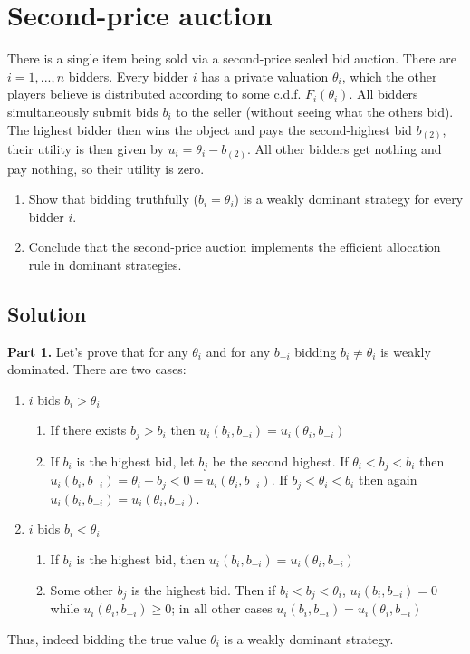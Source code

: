 \documentclass[a4paper]{article}
\newif\ifsolutions
\begin{document}
\section{Second-price auction}

There is a single item being sold via a second-price sealed bid auction. There are $i={1,...,n}$ bidders. Every bidder $i$ has a private valuation $\theta_i$, which the other players believe is distributed according to some c.d.f. $F_i(\theta_i)$. All bidders simultaneously submit bids $b_i$ to the seller (without seeing what the others bid). The highest bidder then wins the object and pays the second-highest bid $b_{(2)}$, their utility is then given by $u_i = \theta_i - b_{(2)}$. All other bidders get nothing and pay nothing, so their utility is zero.
\begin{enumerate}
	\item Show that bidding truthfully ($b_i=\theta_i$) is a weakly dominant strategy for every bidder $i$.
	\item Conclude that the second-price auction implements the efficient allocation rule in dominant strategies.
\end{enumerate}

\ifsolutions
\subsection{Solution}
\textbf{Part 1.}
Let's prove that for any $\theta_{i}$
and for any $b_{-i}$ bidding $b_{i}\neq \theta_{i}$ is weakly dominated.
There are two cases:
\begin{enumerate}
	\item $i$ bids $b_{i}>\theta_{i}$
	\begin{enumerate}
		\item If there exists $b_{j}>b_{i}$ then $u_{i}(b_{i},b_{-i})=u_{i}(\theta_{i},b_{-i})$
		\item If $b_{i}$ is the highest bid, let $b_{j}$ be the second highest.
		If $\theta_{i}<b_{j}<b_{i}$ then $u_{i}(b_{i},b_{-i})=\theta_{i}-b_{j}<0=u_{i}(\theta_{i},b_{-i})$.
		If $b_{j}<\theta_{i}<b_{i}$ then again $u_{i}(b_{i},b_{-i})=u_{i}(\theta_{i},b_{-i})$.
	\end{enumerate}
	\item $i$ bids $b_{i}<\theta_{i}$
	\begin{enumerate}
		\item If $b_{i}$ is the highest bid, then $u_{i}(b_{i},b_{-i})=u_{i}(\theta_{i},b_{-i})$
		\item Some other $b_{j}$ is the highest bid. Then if $b_{i}<b_{j}<\theta_{i}$,
		$u_{i}(b_{i},b_{-i})=0$ while $u_{i}(\theta_{i},b_{-i})\geq0$; in all
		other cases $u_{i}(b_{i},b_{-i})=u_{i}(\theta_{i},b_{-i})$ 
	\end{enumerate}
\end{enumerate}
Thus, indeed bidding the true value $\theta_{i}$ is a weakly dominant
strategy.
\end{document}
